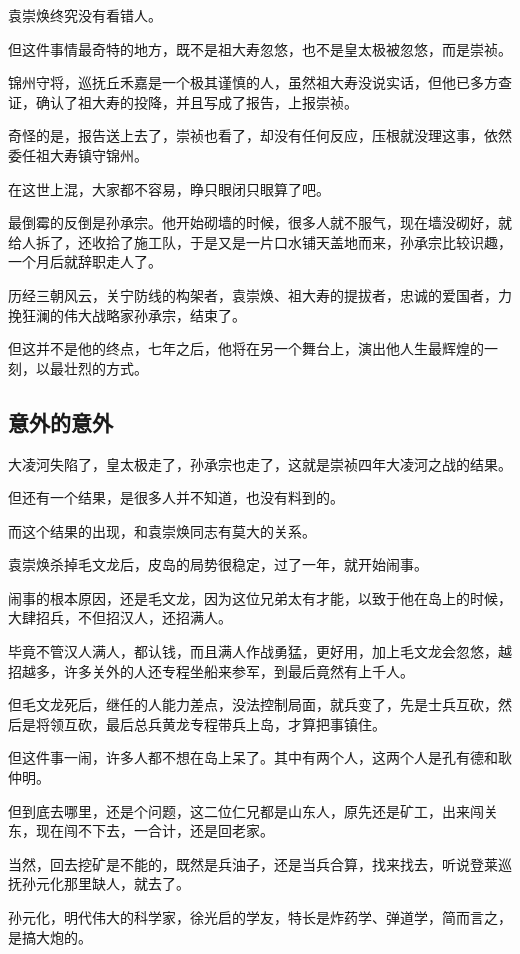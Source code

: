 \begin{multicols}{\theparacolNo}
		袁崇焕终究没有看错人。

		但这件事情最奇特的地方，既不是祖大寿忽悠，也不是皇太极被忽悠，而是崇祯。

		锦州守将，巡抚丘禾嘉是一个极其谨慎的人，虽然祖大寿没说实话，但他已多方查证，确认了祖大寿的投降，并且写成了报告，上报崇祯。

		奇怪的是，报告送上去了，崇祯也看了，却没有任何反应，压根就没理这事，依然委任祖大寿镇守锦州。

		在这世上混，大家都不容易，睁只眼闭只眼算了吧。

		最倒霉的反倒是孙承宗。他开始砌墙的时候，很多人就不服气，现在墙没砌好，就给人拆了，还收拾了施工队，于是又是一片口水铺天盖地而来，孙承宗比较识趣，一个月后就辞职走人了。

		历经三朝风云，关宁防线的构架者，袁崇焕、祖大寿的提拔者，忠诚的爱国者，力挽狂澜的伟大战略家孙承宗，结束了。

		但这并不是他的终点，七年之后，他将在另一个舞台上，演出他人生最辉煌的一刻，以最壮烈的方式。

		\subsection{意外的意外}
		大凌河失陷了，皇太极走了，孙承宗也走了，这就是崇祯四年大凌河之战的结果。

		但还有一个结果，是很多人并不知道，也没有料到的。

		而这个结果的出现，和袁崇焕同志有莫大的关系。

		袁崇焕杀掉毛文龙后，皮岛的局势很稳定，过了一年，就开始闹事。

		闹事的根本原因，还是毛文龙，因为这位兄弟太有才能，以致于他在岛上的时候，大肆招兵，不但招汉人，还招满人。

		毕竟不管汉人满人，都认钱，而且满人作战勇猛，更好用，加上毛文龙会忽悠，越招越多，许多关外的人还专程坐船来参军，到最后竟然有上千人。

		但毛文龙死后，继任的人能力差点，没法控制局面，就兵变了，先是士兵互砍，然后是将领互砍，最后总兵黄龙专程带兵上岛，才算把事镇住。

		但这件事一闹，许多人都不想在岛上呆了。其中有两个人，这两个人是孔有德和耿仲明。

		但到底去哪里，还是个问题，这二位仁兄都是山东人，原先还是矿工，出来闯关东，现在闯不下去，一合计，还是回老家。

		当然，回去挖矿是不能的，既然是兵油子，还是当兵合算，找来找去，听说登莱巡抚孙元化那里缺人，就去了。

		孙元化，明代伟大的科学家，徐光启的学友，特长是炸药学、弹道学，简而言之，是搞大炮的。


\end{multicols}
